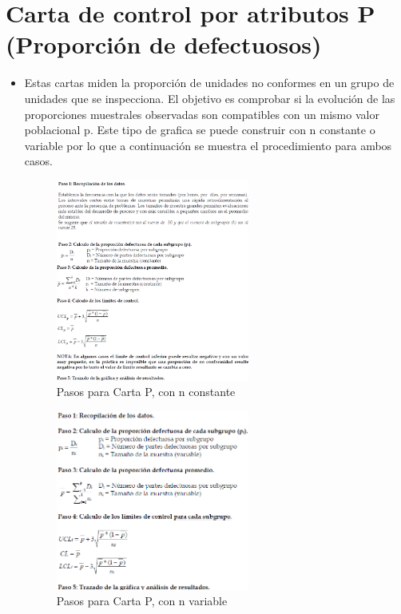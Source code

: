\documentclass{article}
\theoremstyle{mytheoremstyle}
\theoremstyle{mytheoremstyle}
\theoremstyle{myproblemstyle}
\begin{document}
\section{Carta de control por atributos P (Proporción de defectuosos)}
	\begin{itemize}
		\item Estas cartas miden la proporción de unidades no conformes en un grupo de unidades que se
		inspecciona. El objetivo es comprobar si la evolución de las proporciones muestrales observadas
		son compatibles con un mismo valor poblacional p.
		Este tipo de grafica se puede construir con n constante o variable por lo que a continuación se
		muestra el procedimiento para ambos casos.
		\begin{figure}[!ht]
			\centering
			\includegraphics[width=0.6\textwidth]{CartaPVar.png}
			\caption[short]{Pasos para Carta P, con n constante}
			\label{fig:imagen2}
		  \end{figure}
		\begin{figure}[H]
			\centering
			\includegraphics[width=0.6\textwidth]{CartaP.png}
			\caption[short]{Pasos para Carta P, con n variable}
			\label{fig:imagen2}
		  \end{figure}
	
	\end{itemize}
\end{document}
